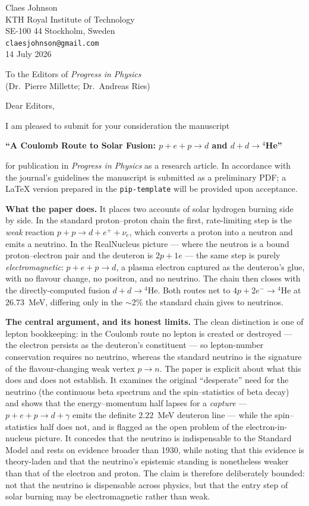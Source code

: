 \documentclass[11pt]{article}
\begin{document}
\noindent
Claes Johnson\\
KTH Royal Institute of Technology\\
SE-100 44 Stockholm, Sweden\\
\texttt{claesjohnson@gmail.com}\\[6pt]
14 July 2026

\bigskip
\noindent
To the Editors of \emph{Progress in Physics}\\
(Dr.\ Pierre Millette; Dr.\ Andreas Ries)

\bigskip
\noindent Dear Editors,

\medskip
I am pleased to submit for your consideration the manuscript

\medskip
\noindent\textbf{``A Coulomb Route to Solar Fusion: $p+e+p\to d$ and $d+d\to{}^4$He''}

\medskip
\noindent for publication in \emph{Progress in Physics} as a research article. In accordance with the
journal's guidelines the manuscript is submitted as a preliminary PDF; a \LaTeX{} version prepared in
the \texttt{pip-template} will be provided upon acceptance.

\medskip
\textbf{What the paper does.} It places two accounts of solar hydrogen burning side by side. In the
standard proton--proton chain the first, rate-limiting step is the \emph{weak} reaction
$p+p\to d+e^{+}+\nu_e$, which converts a proton into a neutron and emits a neutrino. In the RealNucleus
picture --- where the neutron is a bound proton--electron pair and the deuteron is $2p+1e$ --- the same
step is purely \emph{electromagnetic}: $p+e+p\to d$, a plasma electron captured as the deuteron's glue,
with no flavour change, no positron, and no neutrino. The chain then closes with the directly-computed
fusion $d+d\to{}^4$He. Both routes net to $4p+2e^-\to{}^4\mathrm{He}$ at $26.73$~MeV, differing only in
the ${\sim}2\%$ the standard chain gives to neutrinos.

\medskip
\textbf{The central argument, and its honest limits.} The clean distinction is one of lepton
bookkeeping: in the Coulomb route no lepton is created or destroyed --- the electron persists as the
deuteron's constituent --- so lepton-number conservation requires no neutrino, whereas the standard
neutrino is the signature of the flavour-changing weak vertex $p\to n$. The paper is explicit about what
this does and does not establish. It examines the original ``desperate'' need for the neutrino (the
continuous beta spectrum and the spin--statistics of beta decay) and shows that the energy--momentum
half lapses for a \emph{capture} --- $p+e+p\to d+\gamma$ emits the definite $2.22$~MeV deuteron line ---
while the spin--statistics half does not, and is flagged as the open problem of the electron-in-nucleus
picture. It concedes that the neutrino is indispensable to the Standard Model and rests on evidence
broader than 1930, while noting that this evidence is theory-laden and that the neutrino's epistemic
standing is nonetheless weaker than that of the electron and proton. The claim is therefore deliberately
bounded: not that the neutrino is dispensable across physics, but that the entry step of solar burning
may be electromagnetic rather than weak.
\end{document}
